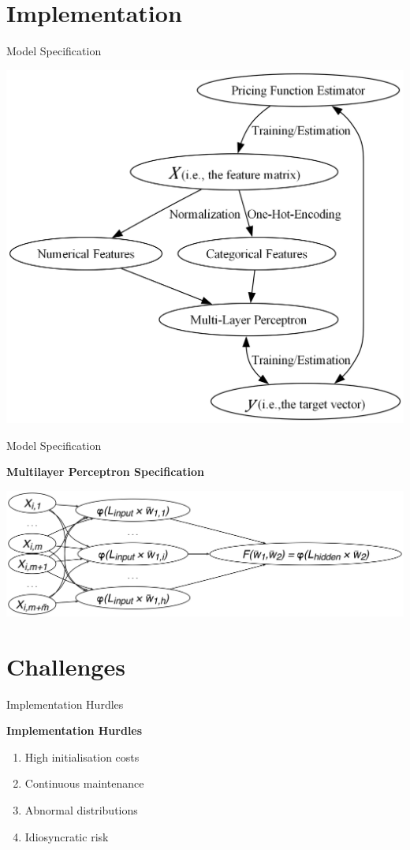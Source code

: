 \documentclass[aspectratio=169,xcolor=dvipsnames]{beamer}
\begin{document}
	\section{Implementation}
	
		\begin{frame}{Model Specification}
			\begin{center}
				\includegraphics[width=0.5\linewidth]{../manuscript/images/MLP.png}
			\end{center}
		\end{frame}
	
		\begin{frame}{Model Specification}
			\begin{center}
				\large \textbf{Multilayer Perceptron Specification}
			\end{center}
			\begin{center}
				\includegraphics[width=\linewidth]{../manuscript/images/elip.png}
			\end{center}
		\end{frame}
		
	\section{Challenges}
	
		\begin{frame}{Implementation Hurdles}
		\begin{center}
			\huge \textbf{Implementation Hurdles}
		\end{center}
		\vspace{5em}
		\begin{enumerate}
			\item High initialisation costs
			\item Continuous maintenance
			\item Abnormal distributions
			\item Idiosyncratic risk
		\end{enumerate}
		\end{frame}
		
\end{document}
